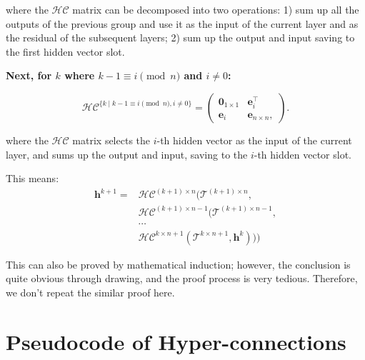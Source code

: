 where the $\mathcal{HC}$ matrix can be decomposed into two operations: 1) sum up all the outputs of the previous group and use it as the input of the current layer and as the residual of the subsequent layers; 2) sum up the output and input saving to the first hidden vector slot.

\textbf{Next, for $k$ where $k-1 \equiv i \pmod{n}$ and $i \neq 0$:}

\begin{equation}
\mathcal{HC}^{\{ k \mid k-1 \equiv i \pmod{n}, i \neq 0 \}}=
  \begin{pmatrix}
  \mathbf{0}_{1\times 1} & \mathbf{e}_i^\intercal \\
  \mathbf{e}_i & \mathbf{e}_{n\times n}, 
  \end{pmatrix}.
\end{equation}

where the \(\mathcal{HC}\) matrix selects the \( i \)-th hidden vector as the input of the current layer, and sums up the output and input, saving to the \( i \)-th hidden vector slot.

This means: 
\begin{align}
\mathbf{h}^{k+1}=&\mathcal{HC}^{(k+1)\times n}(\mathcal{T}^{(k+1)\times n}, \\
&\mathcal{HC}^{(k+1)\times n - 1}(\mathcal{T}^{(k+1)\times n - 1}, \\
&\cdots  \\
&\mathcal{HC}^{k\times n+1}(\mathcal{T}^{k\times n+1},\mathbf{h}^{k})))
\end{align}

This can also be proved by mathematical induction; however, the conclusion is quite obvious through drawing, and the proof process is very tedious. Therefore, we don't repeat the similar proof here.


\newpage
\section{Pseudocode of Hyper-connections}

